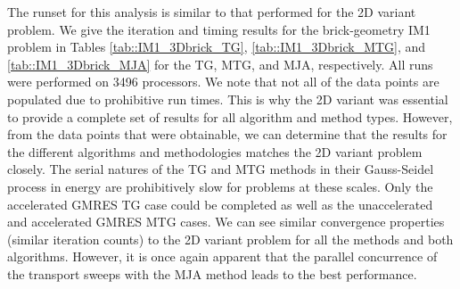 The runset for this analysis is similar to that performed for the 2D variant problem. We give the iteration and timing results for the brick-geometry IM1 problem in Tables \ref{tab::IM1_3Dbrick_TG}, \ref{tab::IM1_3Dbrick_MTG}, and \ref{tab::IM1_3Dbrick_MJA} for the TG, MTG, and MJA, respectively. All runs were performed on 3496 processors. We note that not all of the data points are populated due to prohibitive run times. This is why the 2D variant was essential to provide a complete set of results for all algorithm and method types. However, from the data points that were obtainable, we can determine that the results for the different algorithms and methodologies matches the 2D variant problem closely. The serial natures of the TG and MTG methods in their Gauss-Seidel process in energy are prohibitively slow for problems at these scales. Only the accelerated GMRES TG case could be completed as well as the unaccelerated and accelerated GMRES MTG cases. We can see similar convergence properties (similar iteration counts) to the 2D variant problem for all the methods and both algorithms. However, it is once again apparent that the parallel concurrence of the transport sweeps with the MJA method leads to the best performance.


